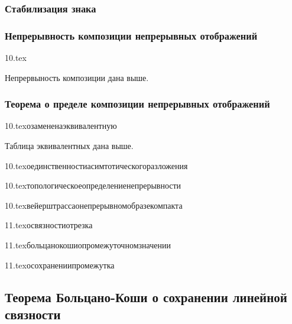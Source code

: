 \subsubsection{Стабилизация знака}


\subsubsection{Непрерывность композиции непрерывных отображений}


{10.tex}{}

Непрервыность композиции дана выше.

\subsubsection{Теорема о пределе композиции непрерывных отображений}


{10.tex}{озамененаэквивалентную}

Таблица эквивалентных дана выше. 

{10.tex}{оединственностиасимтотическогоразложения}

{10.tex}{топологическоеопределениенепрерывности}

{10.tex}{вейерштрассаонепрерывномобразекомпакта}


{11.tex}{освязностиотрезка}

{11.tex}{больцанокошиопромежуточномзначении}

{11.tex}{осохранениипромежутка}

\subsection{Теорема Больцано-Коши о сохранении линейной связности}

